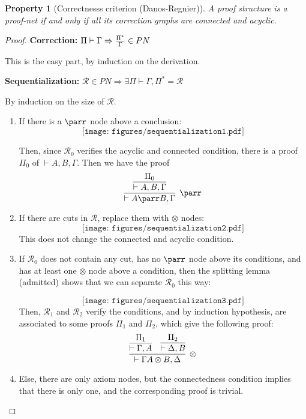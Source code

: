 \documentclass[a4paper,10pt]{article}
\newtheorem{prop}{Property}
\begin{document}
\begin{prop}[Correctnesss criterion (Danos-Regnier)]
	A proof structure is a proof-net if and only if all its correction graphs are connected and acyclic.
\end{prop}
\begin{proof}
	\textbf{Correction:} $\Pi \vdash \Gamma \Rightarrow {\Pi^*\over \Gamma} \in PN$
	
	This is the easy part, by induction on the derivation.
	
	\textbf{Sequentialization:} ${\mathcal R} \in PN \Rightarrow \exists \Pi \vdash \Gamma, \Pi^* = \mathcal R$
	
	By induction on the size of $\mathcal R$.
	\begin{enumerate}
			\item If there is a $\parr$ node above a conclusion:
			$$\texttt{[image: figures/sequentialization1.pdf]}$$
			
			Then, since $\mathcal R_0$ verifies the acyclic and connected condition, there is a proof $\Pi_0$ of $\vdash A, B, \Gamma$. Then we have the proof 
			$$\infer[\parr]{\vdash A\parr B, \Gamma}{\infer{\vdash A, B, \Gamma}{\Pi_0}}$$
			
			\item If there are cuts in $\mathcal R$, replace them with $\otimes$ nodes: 
			$$\texttt{[image: figures/sequentialization2.pdf]}$$
			This does not change the connected and acyclic condition.
			
			\item If $\mathcal R_0$ does not contain any cut, has no $\parr$ node above its conditions, and has at least one $\otimes$ node above a condition, then the splitting lemma (admitted) shows that we can separate $\mathcal R_0$ this way: 
			
			$$\texttt{[image: figures/sequentialization3.pdf]}$$
			Then, $\mathcal R_1$ and $\mathcal R_2$ verify the conditions, and by induction hypothesis, are associated to some proofs $\Pi_1$ and $\Pi_2$, which give the following proof: $$\infer[\otimes]{\vdash \Gamma A\otimes B, \Delta}{\infer{\vdash \Gamma, A}{\Pi_1} & \infer{\vdash \Delta, B}{\Pi_2}}$$
			
			\item Else, there are only axiom nodes, but the connectedness condition implies that there is only one, and the corresponding proof is trivial.
	\end{enumerate}
	
		
	
\end{proof}
\end{document}
